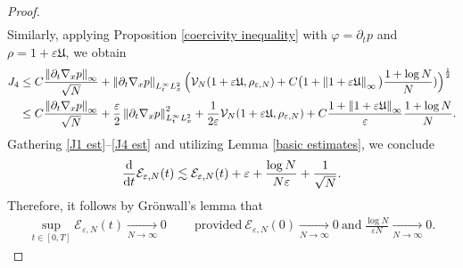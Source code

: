 \documentclass[11pt,reqno]{amsart}
\numberwithin{equation}{section}
\def\dd{{\rm d}}
\begin{document}
\begin{proof}
\begin{align}
\label{est J3} 
\end{align}
Similarly, applying Proposition \ref{coercivity inequality} with $\varphi=\partial_t p$ 
and $\rho=1+\varepsilon\mathfrak{U}$, we obtain
\begin{align}
J_{4}&\leq
C\frac{\left\Vert \partial_{t}\nabla_{x}p\right\Vert_{\infty}}{\sqrt{N}}
+\left\Vert \partial_{t}\nabla_{x}p\right\Vert_{L^{\infty}_{t}L^{2}_{x}}
\Big(\mathcal{V}_{N}(1+\varepsilon\mathfrak{U},\rho_{\varepsilon,N})
+C\big(1+\left\Vert 1+\varepsilon \mathfrak{U}\right\Vert_{\infty} \big)
  \frac{1+\log N}{N})\Big)^{\frac{1}{2}} 
 \notag\\
 &\leq C \frac{\left\Vert \partial_{t}\nabla_{x}p\right\Vert_{\infty} }{\sqrt{N}}+\frac{\varepsilon}{2}\left\Vert \partial_{t}\nabla_{x}p\right\Vert^{2}_{L^{\infty}_{t}L^{2}_{x}}+\frac{1}{2\varepsilon}\mathcal{V}_{N}(1+\varepsilon\mathfrak{U},\rho_{\varepsilon,N})+C\frac{1+\left\Vert 1+\varepsilon\mathfrak{U}\right\Vert_{\infty}}{\varepsilon}\frac{1+\log N}{N}.
\label{J4 est}  
\end{align}
Gathering \eqref{J1 est}--\eqref{J4 est} and utilizing Lemma  \ref{basic estimates},
we conclude 
\begin{align*}
\frac{\dd}{\dd t}\mathcal{E}_{\varepsilon,N}(t)\lesssim \mathcal{E}_{\varepsilon,N}(t)+\varepsilon+\frac{\log N}{N\varepsilon}+\frac{1}{\sqrt{N}}.    
\end{align*}
Therefore, it follows by Gr\"onwall's lemma that 
\begin{align*}
\underset{t\in [0,T]}{\sup}\mathcal{E}_{\varepsilon,N}(t)\underset{N\rightarrow \infty}{\rightarrow}0 \ \qquad \mbox{provided}\ \mathcal{E}_{\varepsilon,N}(0)\underset{N\rightarrow \infty}{\longrightarrow}0 \ \mbox{and}\ \frac{\log N}{\varepsilon N}\underset{N\rightarrow \infty}{\longrightarrow}0.  \end{align*}
\end{proof}
\end{document}
